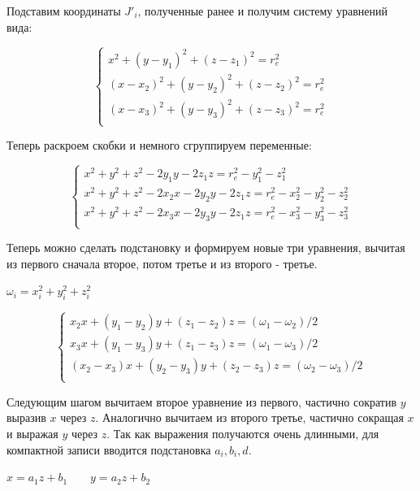 Подставим координаты $J'_{i}$, полученные ранее и получим систему уравнений вида:

\begin{equation*}
    \begin{cases}
        x^{2} + (y - y_{1})^{2} + (z - z_{1})^{2} = r^{2}_{e}\\
        (x - x_{2})^{2} + (y - y_{2})^{2} + (z - z_{2})^{2} = r^{2}_{e}\\
        (x - x_{3})^{2} + (y - y_{3})^{2} + (z - z_{3})^{2} = r^{2}_{e}\\
    \end{cases}    
\end{equation*}

Теперь раскроем скобки и немного сгруппируем переменные:

\begin{equation*}
    \begin{cases}
x^{2} + y^{2} + z^{2} - 2y_{1}y - 2z_{1}z = r^2_{e} - y^2_{1} - z^2_{1}\\
x^{2} + y^{2} + z^{2} - 2x_{2}x - 2y_{2}y - 2z_{1}z = r^2_{e} - x^2_{2} - y^2_{2} - z^2_{2}\\
x^{2} + y^{2} + z^{2} - 2x_{3}x - 2y_{3}y - 2z_{1}z = r^2_{e} - x^2_{3} - y^2_{3} -z^2_{3}\\
    \end{cases}    
\end{equation*}

Теперь можно сделать подстановку и формируем новые три уравнения, вычитая из первого сначала второе, потом третье и из второго - третье.
\begin{center}
    $\omega_{i} = x^2_{i} + y^2_{i}  + z^2_{i} $
\end{center}

\begin{equation*}
    \begin{cases}
x_{2}x + (y_{1} - y_{2})y + (z_{1} - z_{2})z = (\omega_{1} - \omega_{2})/2 \\
x_{3}x + (y_{1} - y_{3})y + (z_{1} - z_{3})z = (\omega_{1} - \omega_{3})/2 \\
(x_{2} - x_{3})x + (y_{2} - y_{3})y + (z_{2} - z_{3})z = (\omega_{2} - \omega_{3})/2 \\
    \end{cases}    
\end{equation*}

Следующим шагом вычитаем второе уравнение из первого, частично сократив $y$ выразив $x$ через $z$. Аналогично вычитаем из второго третье, частично сокращая $x$ и выражая $y$ через $z$. Так как выражения получаются очень длинными, для компактной записи вводится подстановка $a_{i},b_{i},d$.
\begin{center}
$x = a_{1}z+b_{1} \qquad  y=a_{2}z+b_{2}$\\
\end{center}

